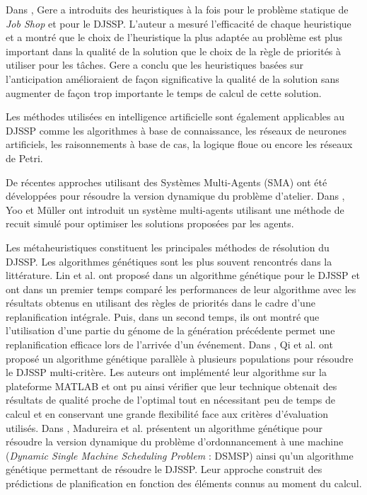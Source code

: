 Dans \cite{Gere1966}, Gere a introduits des heuristiques à la fois pour le problème statique de \textit{Job Shop} et pour le DJSSP. L'auteur a mesuré l'efficacité de chaque heuristique et a montré que le choix de l'heuristique la plus adaptée au problème est plus important dans la qualité de la solution que le choix de la règle de priorités à utiliser pour les tâches. Gere a conclu que les heuristiques basées sur l'anticipation amélioraient de façon significative la qualité de la solution sans augmenter de façon trop importante le temps de calcul de cette solution.

Les méthodes utilisées en intelligence artificielle sont également applicables au DJSSP comme les algorithmes à base de connaissance, les réseaux de neurones artificiels, les raisonnements à base de cas, la logique floue ou encore les réseaux de Petri.

De récentes approches utilisant des Systèmes Multi-Agents (SMA) ont été développées pour résoudre la version dynamique du problème d'atelier. Dans \cite{Yoo2002}, Yoo et Müller ont introduit un système multi-agents utilisant une méthode de recuit simulé pour optimiser les solutions proposées par les agents.

Les métaheuristiques constituent les principales méthodes de résolution du DJSSP. Les algorithmes génétiques sont les plus souvent rencontrés dans la littérature. Lin et al. ont proposé dans \cite{Lin1997} un algorithme génétique pour le DJSSP et ont dans un premier temps comparé les performances de leur algorithme avec les résultats obtenus en utilisant des règles de priorités dans le cadre d'une replanification intégrale. Puis, dans un second temps, ils ont montré que l'utilisation d'une partie du génome de la génération précédente permet une replanification efficace lors de l'arrivée d'un événement.
Dans \cite{Qi2000}, Qi et al. ont proposé un algorithme génétique parallèle à plusieurs populations pour résoudre le DJSSP multi-critère. Les auteurs ont implémenté leur algorithme sur la plateforme MATLAB et ont pu ainsi vérifier que leur technique obtenait des résultats de qualité proche de l'optimal tout en nécessitant peu de temps de calcul et en conservant une grande flexibilité face aux critères d'évaluation utilisés. Dans \cite{Madureira2001}, Madureira et al.  présentent un algorithme génétique pour résoudre la version dynamique du problème d'ordonnancement à une machine (\textit{Dynamic Single Machine Scheduling Problem} : DSMSP) ainsi qu'un algorithme génétique permettant de résoudre le DJSSP. Leur approche construit des prédictions de planification en fonction des éléments connus au moment du calcul.


